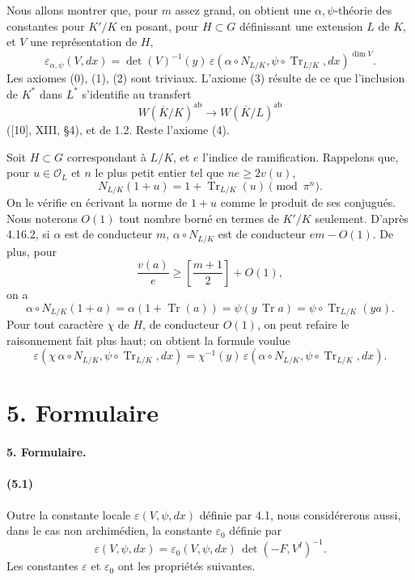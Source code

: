 \documentclass[10pt,letterpaper]{article}
\newcommand{\Tr}{\operatorname{Tr}}
\providecommand{\ab}{\mathrm{ab}}
\providecommand{\ab}{\mathrm{ab}}
\providecommand{\ab}{\mathrm{ab}}
\providecommand{\Tr}{\operatorname{Tr}}
\providecommand{\Tr}{\operatorname{Tr}}
\providecommand{\Tr}{\operatorname{Tr}}
\begin{document}
Nous allons montrer que, pour \(m\) assez grand, on obtient une \(\alpha,\psi\)-théorie des constantes pour \(K'/K\) en posant, pour \(H\subset G\) définissant une extension \(L\) de \(K\), et \(V\) une représentation de \(H\),
\[
\varepsilon_{\alpha,\psi}(V,dx)
=
\det(V)^{-1}(y)\,
\varepsilon(\alpha\circ N_{L/K},\psi\circ\Tr_{L/K},dx)^{\dim V}.
\]
Les axiomes (0), (1), (2) sont triviaux. L'axiome (3) résulte de ce que l'inclusion de \(K^*\) dans \(L^*\) s'identifie au transfert
\[
W(\overline K/K)^{\ab}\longrightarrow W(\overline K/L)^{\ab}
\]
([10], XIII, §4), et de 1.2. Reste l'axiome (4).

Soit \(H\subset G\) correspondant à \(L/K\), et \(e\) l'indice de ramification. Rappelons que, pour \(u\in\mathcal O_L\) et \(n\) le plus petit entier tel que \(ne\ge2v(u)\),
\[
\tag{4.16.2}
N_{L/K}(1+u)=1+\Tr_{L/K}(u)\pmod{\pi^n}.
\]
On le vérifie en écrivant la norme de \(1+u\) comme le produit de ses conjugués. Nous noterons \(O(1)\) tout nombre borné en termes de \(K'/K\) seulement. D'après 4.16.2, si \(\alpha\) est de conducteur \(m\), \(\alpha\circ N_{L/K}\) est de conducteur \(em-O(1)\). De plus, pour
\[
\frac{v(a)}e\ge \left[\frac{m+1}{2}\right]+O(1),
\]
on a
\[
\alpha\circ N_{L/K}(1+a)
=
\alpha(1+\Tr(a))
=
\psi(y\,\Tr a)
=
\psi\circ\Tr_{L/K}(ya).
\]
Pour tout caractère \(\chi\) de \(H\), de conducteur \(O(1)\), on peut refaire le raisonnement fait plus haut; on obtient la formule voulue
\[
\varepsilon(\chi\,\alpha\circ N_{L/K},\psi\circ\Tr_{L/K},dx)
=
\chi^{-1}(y)\,
\varepsilon(\alpha\circ N_{L/K},\psi\circ\Tr_{L/K},dx).
\]

\section*{5. Formulaire}

\paragraph{5. Formulaire.}

\paragraph{(5.1)} Outre la constante locale \(\varepsilon(V,\psi,dx)\) définie par 4.1, nous considérerons aussi, dans le cas non archimédien, la constante \(\varepsilon_0\) définie par
\[
\varepsilon(V,\psi,dx)
=
\varepsilon_0(V,\psi,dx)\,\det(-F,V^I)^{-1}.
\]
Les constantes \(\varepsilon\) et \(\varepsilon_0\) ont les propriétés suivantes.
\end{document}
